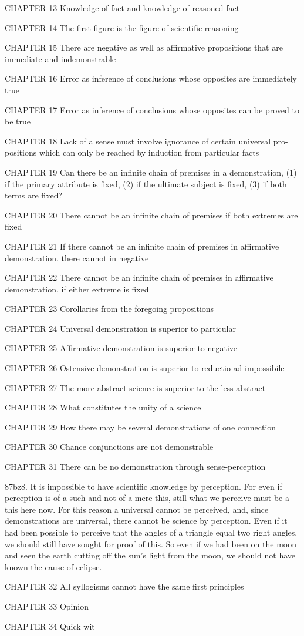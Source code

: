 CHAPTER 13
Knowledge of fact and knowledge of reasoned fact

CHAPTER 14
The first figure is the figure of scientific reasoning

CHAPTER 15
There are negative as well as affirmative propositions that are
immediate and indemonstrable

CHAPTER 16
Error as inference of conclusions whose opposites are
immediately true

CHAPTER 17
Error as inference of conclusions whose opposites can be
proved to be true

CHAPTER 18
Lack of a sense must involve ignorance of certain universal pro-
positions which can only be reached by induction from particular
facts

CHAPTER 19
Can there be an infinite chain of premises in a demonstration,
(1) if the primary attribute is fixed, (2) if the ultimate subject is fixed,
(3) if both terms are fixed?

CHAPTER 20
There cannot be an infinite chain of premises if both extremes
are fixed

CHAPTER 21
If there cannot be an infinite chain of premises in affirmative
demonstration, there cannot in negative

CHAPTER 22
There cannot be an infinite chain of premises in affirmative
demonstration, if either extreme is fixed

CHAPTER 23
Corollaries from the foregoing propositions

CHAPTER 24
Universal demonstration is superior to particular

CHAPTER 25
Affirmative demonstration is superior to negative

CHAPTER 26
Ostensive demonstration is superior to reductio ad impossibile

CHAPTER 27
The more abstract science is superior to the less abstract

CHAPTER 28
What constitutes the unity of a science

CHAPTER 29
How there may be several demonstrations of one connection

CHAPTER 30
Chance conjunctions are not demonstrable

CHAPTER 31
There can be no demonstration through sense-perception

87bz8. It is impossible to have scientific knowledge by perception. 
For even if perception is of a such and not of a mere this,
still what we perceive must be a this here now. For this
reason a universal cannot be perceived, and, since demonstrations
are universal, there cannot be science by perception. Even if it
had been possible to perceive that the angles of a triangle equal
two right angles, we should still have sought for proof of this.
So even if we had been on the moon and seen the earth cutting
off the sun's light from the moon, we should not have known the
cause of eclipse.

CHAPTER 32
All syllogisms cannot have the same first principles

CHAPTER 33
Opinion

CHAPTER 34
Quick wit
